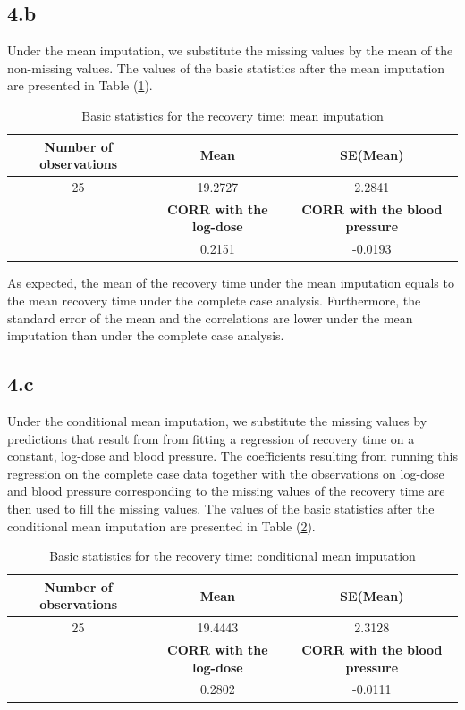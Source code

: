 \documentclass{article}
\begin{document}
\subsection*{4.b}

Under the mean imputation, we substitute the missing values by the mean of the non-missing values. The values of the basic statistics after the mean imputation are presented in Table (\ref{Tab_2}).

\begin{table}[H]
\caption{Basic statistics for the recovery time: mean imputation}
\label{Tab_2}
\begin{tabular}{|c |c| c|}

\hline
\hline
 \textbf{Number of observations} & \textbf{Mean} &\textbf{SE(Mean)} \\[2ex]
\hline
25 &19.2727 &2.2841 \\
\hline
 &\textbf{CORR with the log-dose} &\textbf{CORR with the blood pressure} \\[2ex] 
\hline
 &0.2151 &-0.0193 \\
\hline
\hline
 

\end{tabular}
\end{table}


As expected, the mean of the recovery time under the mean imputation equals to the mean recovery time under the complete case analysis. Furthermore, the standard error of the mean and the correlations are lower under the mean imputation than under the complete case analysis.  


\subsection*{4.c}

Under the conditional mean imputation, we substitute the missing values by predictions that result from from fitting a regression of recovery time on a constant, log-dose and blood pressure. The coefficients resulting from running this regression on the complete case data together with the observations on log-dose and blood pressure corresponding to the missing values of the recovery time are then used to fill the missing values. The values of the basic statistics after the conditional mean imputation are presented in Table (\ref{Tab_3}).

\begin{table}[H]
\caption{Basic statistics for the recovery time: conditional mean imputation}
\label{Tab_3}
\begin{tabular}{|c |c| c|}

\hline
\hline
 \textbf{Number of observations} & \textbf{Mean} &\textbf{SE(Mean)} \\[2ex]
\hline
25 &19.4443 &2.3128 \\
\hline
 &\textbf{CORR with the log-dose} &\textbf{CORR with the blood pressure} \\[2ex] 
\hline
 &0.2802 &-0.0111 \\
\hline
\hline
 

\end{tabular}
\end{table}
\end{document}
